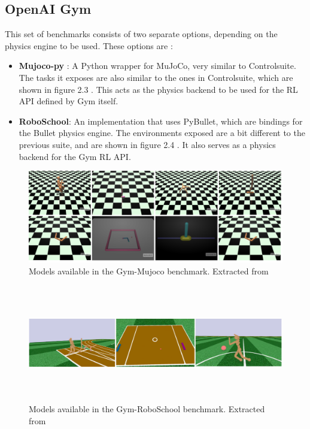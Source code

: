     \subsection{OpenAI Gym}
    This set of benchmarks consists of two separate options, depending on the physics engine to be used. These options are :

    \begin{itemize}
        \item \textbf{Mujoco-py} : A Python wrapper for MuJoCo, very similar to Controlsuite. The tasks it
            exposes are also similar to the ones in Controlsuite, which are shown in figure 2.3 . This acts as
            the physics backend to be used for the RL API defined by Gym itself.
        \item \textbf{RoboSchool}: An implementation that uses PyBullet, which are bindings for the Bullet physics
            engine. The environments exposed are a bit different to the previous suite, and are shown in figure 2.4 . It
            also serves as a physics backend for the Gym RL API.
    \end{itemize}

    \begin{figure}[!ht]
        \centering
        \includegraphics[width=5.5in]{./chapters/imgs/img_openai_gym_mujoco_envs.png}
        \caption[Gym Mujoco models]{Models available in the Gym-Mujoco benchmark. Extracted from \citet{OpenAIgym}}
        \label{fig:gym-mujoco-envs}
    \end{figure}

    \begin{figure}[!ht]
        \centering
        \includegraphics[width=6.0in,height=2.0in]{./chapters/imgs/img_openai_gym_roboschool_envs.png}
        \caption[Gym RoboSchool models]{Models available in the Gym-RoboSchool benchmark. Extracted from \citet{OpenAIgym}}
        \label{fig:gym-roboschool-envs}
    \end{figure}


